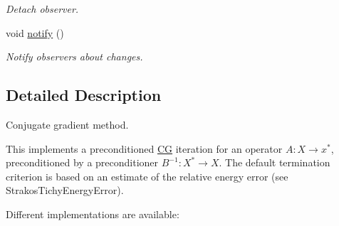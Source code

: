 \begin{DoxyCompactItemize}
\begin{DoxyCompactList}\small\item\em Detach observer. \end{DoxyCompactList}\item 
void \hyperlink{classSpacy_1_1Mixin_1_1MixinConnection_a1ddeaa78a3bb4a38c2cca36d1f99fe36}{notify} ()\hypertarget{classSpacy_1_1Mixin_1_1MixinConnection_a1ddeaa78a3bb4a38c2cca36d1f99fe36}{}\label{classSpacy_1_1Mixin_1_1MixinConnection_a1ddeaa78a3bb4a38c2cca36d1f99fe36}

\begin{DoxyCompactList}\small\item\em Notify observers about changes. \end{DoxyCompactList}\end{DoxyCompactItemize}


\subsection{Detailed Description}
Conjugate gradient method. 

This implements a preconditioned \hyperlink{namespaceSpacy_1_1CG}{CG} iteration for an operator $ A: X\to x^* $, preconditioned by a preconditioner $ B^{-1}: X^* \to X $. The default termination criterion is based on an estimate of the relative energy error (see Strakos\+Tichy\+Energy\+Error).

Different implementations are available\+:


